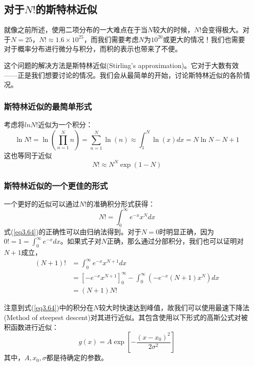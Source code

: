 \documentclass[UTF8]{ctexart}
\numberwithin{equation}{section}%
\numberwithin{figure}{section}%
\begin{document}
    \subsection{\texorpdfstring{对于$N!$的斯特林近似}{对于N!的斯特林近似}}\label{sec3.11}
    就像之前所述，使用二项分布的一大难点在于当$N$较大的时候，$N!$会变得极大。对于$N=25$，$N!\approx 1.6\times 10^{25}$，而我们需要考虑$N$为$10^{20}$或更大的情况！我们也需要对于概率分布进行微分与积分，而积的表示也带来了不便。

    这个问题的解决方法是斯特林近似(Stirling's approximation)。它对于大数有效——正是我们想要讨论的情况。我们会从最简单的开始，讨论斯特林近似的各阶情况。
    \subsubsection{斯特林近似的最简单形式}
    考虑将$lnN!$近似为一个积分：
    \begin{equation}
        \ln N !=\ln \left(\prod_{n=1}^{N} n\right)=\sum_{n=1}^{N} \ln (n) \approx \int_{1}^{N} \ln (x) d x=N \ln N-N+1
    \end{equation}
    这也等同于近似
    \begin{equation}\label{eq3.63}
        N ! \approx N^{N} \exp (1-N)
    \end{equation}
    \subsubsection{斯特林近似的一个更佳的形式}
    一个更好的近似可以通过$N!$的准确积分形式获得：
    \begin{equation}\label{eq3.64}
        N !=\int_{0}^{\infty} e^{-x} x^{N} d x
    \end{equation}
    式(\ref{eq3.64})的正确性可以由归纳法得到。对于$N=0$时明显正确，因为$0!=1=\int^{\infty}_0e^{-x}dx$。如果式子对$N$正确，那么通过分部积分，我们也可以证明对$N+1$成立，
    \begin{equation}
        \begin{aligned}
            (N+1) ! &=\int_{0}^{\infty} e^{-x} x^{N+1} d x \\
            &=\left[-e^{-x} x^{N+1}\right]_{0}^{\infty}-\int_{0}^{\infty}\left(-e^{-x}(N+1) x^{N}\right) d x \\
            &=(N+1) N !
            \end{aligned}
    \end{equation}
    
    注意到式(\ref{eq3.64})中的积分在$N$较大时快速达到峰值，故我们可以使用最速下降法(Method of steepest descent)对其进行近似。其包含使用以下形式的高斯公式对被积函数进行近似：
    \begin{equation}
        g(x)=A \exp \left[-\frac{\left(x-x_{0}\right)^{2}}{2 \sigma^{2}}\right]
    \end{equation}
    其中，$A,x_0,\sigma$都是待确定的参数。
\end{document}
